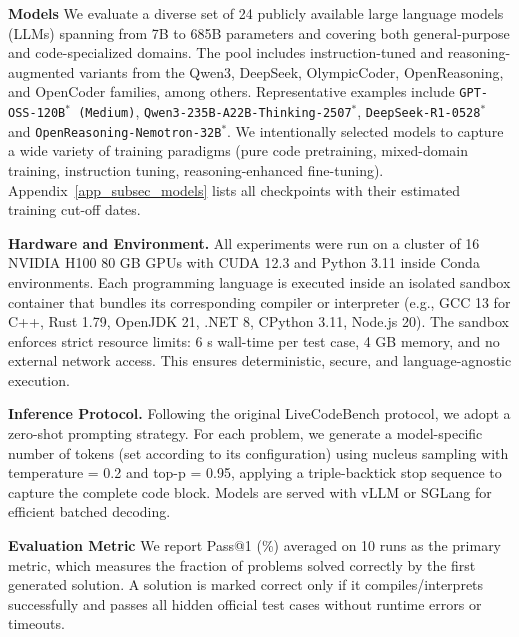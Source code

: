 \documentclass{article} %
\begin{document}
\textbf{Models} We evaluate a diverse set of 24 publicly available large language models (LLMs) spanning from 7B to 685B parameters and covering both general-purpose and code-specialized domains. The pool includes instruction-tuned and reasoning-augmented variants from the Qwen3, DeepSeek, OlympicCoder, OpenReasoning, and OpenCoder families, among others.
Representative examples include \texttt{GPT-OSS-120B$^*$ (Medium)}, \texttt{Qwen3-235B-A22B-Thinking-2507$^*$}, \texttt{DeepSeek-R1-0528$^*$} and \texttt{OpenReasoning-Nemotron-32B$^*$}.
We intentionally selected models to capture a wide variety of training paradigms (pure code pretraining, mixed-domain training, instruction tuning, reasoning-enhanced fine-tuning).
Appendix~\ref{app_subsec_models} lists all checkpoints with their estimated training cut-off dates.

\textbf{Hardware and Environment.}
All experiments were run on a cluster of 16 NVIDIA H100 80 GB GPUs with CUDA 12.3 and Python 3.11 inside Conda environments.
Each programming language is executed inside an isolated sandbox container that bundles its corresponding compiler or interpreter (e.g., GCC 13 for C++, Rust 1.79, OpenJDK 21, .NET 8, CPython 3.11, Node.js 20).
The sandbox enforces strict resource limits: 6 s wall-time per test case, 4 GB memory, and no external network access.
This ensures deterministic, secure, and language-agnostic execution.

\textbf{Inference Protocol.}
Following the original LiveCodeBench protocol, we adopt a zero-shot prompting strategy.
For each problem, we generate a model-specific number of tokens (set according to its configuration) using nucleus sampling with temperature = 0.2 and top-p = 0.95, applying a triple-backtick stop sequence to capture the complete code block.
Models are served with vLLM \citep{kwon2023efficient} or SGLang \citep{zheng2024sglang} for efficient batched decoding.

\textbf{Evaluation Metric}
We report Pass@1 (\%) averaged on 10 runs as the primary metric, which measures the fraction of problems solved correctly by the first generated solution. A solution is marked correct only if it compiles/interprets successfully and passes all hidden official test cases without runtime errors or timeouts.




\end{document}
